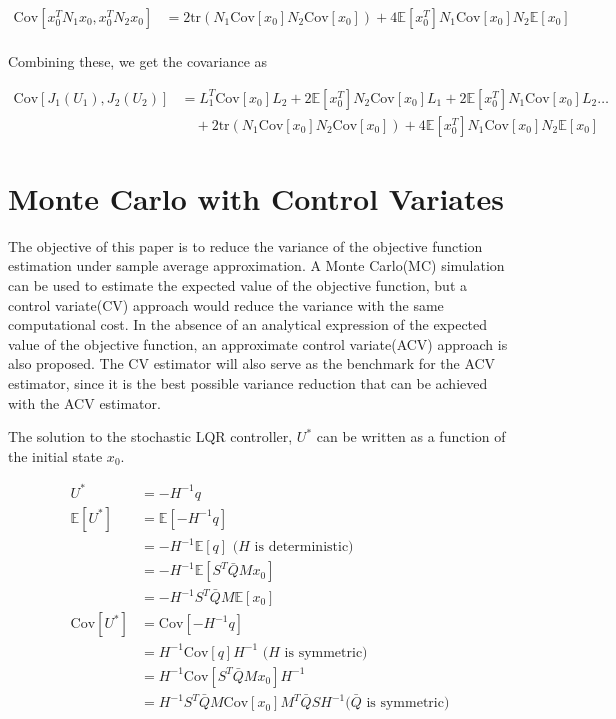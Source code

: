 \documentclass{article}
\begin{document}
$$
\begin{aligned}
  \text{Cov}[x_0^T N_1 x_0, x_0^T N_2 x_0] &= 2 \text{tr}(N_1 \text{Cov}[x_0] N_2 \text{Cov}[x_0]) + 4 \mathbb{E}[x_0^T]N_1\text{Cov}[x_0]N_2\mathbb{E}[x_0] \\
\end{aligned}
$$

Combining these, we get the covariance as

\begin{equation}
  \begin{aligned}
    \text{Cov}[J_1(U_1), J_2(U_2)] &= L_1^T \text{Cov}[x_0] L_2 + 2 \mathbb{E}[x_0^T] N_2 \text{Cov}[x_0] L_1 + 2 \mathbb{E}[x_0^T] N_1 \text{Cov}[x_0] L_2 \hdots \\
    & \quad + 2 \text{tr}(N_1 \text{Cov}[x_0] N_2 \text{Cov}[x_0]) + 4 \mathbb{E}[x_0^T]N_1\text{Cov}[x_0]N_2\mathbb{E}[x_0]
  \end{aligned}
\end{equation}

\section{Monte Carlo with Control Variates}

The objective of this paper is to reduce the variance of the objective function estimation under sample average approximation.
A Monte Carlo(MC) simulation can be used to estimate the expected value of the objective function, but a control variate(CV) approach
would reduce the variance with the same computational cost. In the absence of an analytical expression of the expected value of the
objective function, an approximate control variate(ACV) approach is also proposed. The CV estimator will also serve as
the benchmark for the ACV estimator, since it is the best possible variance reduction that can be achieved with the ACV estimator.

The solution to the stochastic LQR controller, $U^*$ can be written as a function of the initial state $x_0$.

$$
\begin{aligned}
  U^* &= -H^{-1} q \\
  \mathbb{E}[U^*] &= \mathbb{E}[-H^{-1} q] \\
  &= -H^{-1} \mathbb{E}[q] \text{ ($H$ is deterministic)} \\
  &= -H^{-1} \mathbb{E}[S^T \bar{Q} M x_0] \\
  &= -H^{-1} S^T \bar{Q} M \mathbb{E}[x_0] \\
  \text{Cov}[U^*] &= \text{Cov}[-H^{-1} q] \\
  &= H^{-1} \text{Cov}[q] H^{-1} \text{ ($H$ is symmetric)} \\
  &= H^{-1} \text{Cov}[S^T \bar{Q} M x_0] H^{-1} \\
  &= H^{-1} S^T \bar{Q} M \text{Cov}[x_0] M^T \bar{Q} S H^{-1} \text{($\bar{Q}$ is symmetric)} \\
\end{aligned}
$$
\end{document}
